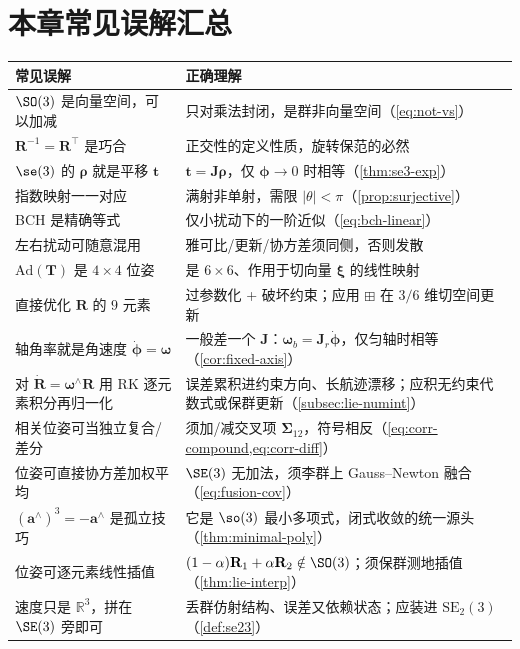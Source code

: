 \section*{本章常见误解汇总}
\begin{table}[H]\centering\small
\begin{tabular}{p{} p{}}
\toprule
\textbf{常见误解} & \textbf{正确理解} \\
\midrule
$\SO(3)$ 是向量空间，可以加减 & 只对乘法封闭，是群非向量空间（\cref{eq:not-vs}）\\
$\mathbf{R}^{-1}=\mathbf{R}^\top$ 是巧合 & 正交性的定义性质，旋转保范的必然 \\
$\se(3)$ 的 $\boldsymbol{\rho}$ 就是平移 $\mathbf{t}$ & $\mathbf{t}=\mathbf{J}\boldsymbol{\rho}$，仅 $\boldsymbol{\phi}\to0$ 时相等（\cref{thm:se3-exp}）\\
指数映射一一对应 & 满射非单射，需限 $|\theta|<\pi$（\cref{prop:surjective}）\\
BCH 是精确等式 & 仅小扰动下的一阶近似（\cref{eq:bch-linear}）\\
左右扰动可随意混用 & 雅可比/更新/协方差须同侧，否则发散 \\
$\mathrm{Ad}(\mathbf{T})$ 是 $4\times4$ 位姿 & 是 $6\times6$、作用于切向量 $\boldsymbol{\xi}$ 的线性映射 \\
直接优化 $\mathbf{R}$ 的 $9$ 元素 & 过参数化 + 破坏约束；应用 $\boxplus$ 在 $3/6$ 维切空间更新 \\
轴角率就是角速度 $\dot{\boldsymbol{\phi}}=\boldsymbol{\omega}$ & 一般差一个 $\mathbf{J}$：$\boldsymbol{\omega}_b=\mathbf{J}_r\dot{\boldsymbol{\phi}}$，仅匀轴时相等（\cref{cor:fixed-axis}）\\
对 $\dot{\mathbf{R}}=\boldsymbol{\omega}^\wedge\mathbf{R}$ 用 RK 逐元素积分再归一化 & 误差累积进约束方向、长航迹漂移；应积无约束代数式或保群更新（\cref{subsec:lie-numint}）\\
相关位姿可当独立复合/差分 & 须加/减交叉项 $\boldsymbol{\Sigma}_{12}$，符号相反（\cref{eq:corr-compound,eq:corr-diff}）\\
位姿可直接协方差加权平均 & $\SE(3)$ 无加法，须李群上 Gauss--Newton 融合（\cref{eq:fusion-cov}）\\
$(\mathbf{a}^\wedge)^3=-\mathbf{a}^\wedge$ 是孤立技巧 & 它是 $\so(3)$ 最小多项式，闭式收敛的统一源头（\cref{thm:minimal-poly}）\\
位姿可逐元素线性插值 & $(1-\alpha)\mathbf{R}_1+\alpha\mathbf{R}_2\notin\SO(3)$；须保群测地插值（\cref{thm:lie-interp}）\\
速度只是 $\mathbb{R}^3$，拼在 $\SE(3)$ 旁即可 & 丢群仿射结构、误差又依赖状态；应装进 $\mathrm{SE}_2(3)$（\cref{def:se23}）\\
\bottomrule
\end{tabular}
\end{table}

